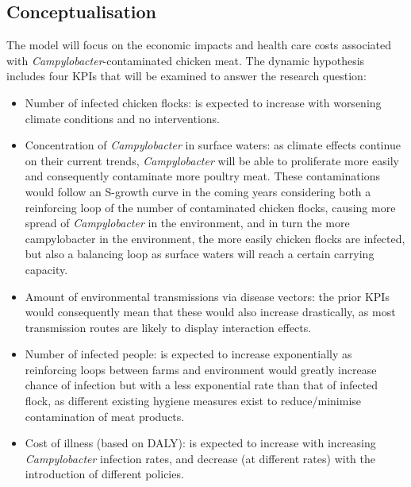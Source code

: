 \subsection{Conceptualisation}
The model will focus on the economic impacts and health care costs associated with \textit{Campylobacter}-contaminated chicken meat. 
The dynamic hypothesis includes four KPIs that will be examined to answer the research question: 
\begin{itemize}
    \item Number of infected chicken flocks: is expected to increase with worsening climate conditions and no interventions.
    \item Concentration of \textit{Campylobacter} in surface waters: as climate effects continue on their current trends, \textit{Campylobacter} will be able to proliferate more easily and consequently contaminate more poultry meat. These contaminations would follow an S-growth curve in the coming years considering both a reinforcing loop of the number of contaminated chicken flocks, causing more spread of \textit{Campylobacter} in the environment, and in turn the more campylobacter in the environment, the more easily chicken flocks are infected, but also a balancing loop as surface waters will reach a certain carrying capacity. %
    \item Amount of environmental transmissions via disease vectors: the prior KPIs would consequently mean that these would also increase drastically, as most transmission routes are likely to display interaction effects.
    \item Number of infected people: is expected to increase exponentially as reinforcing loops between farms and environment would greatly increase chance of infection but with a less exponential rate than that of infected flock, as different existing hygiene measures exist to reduce/minimise contamination of meat products.
    \item Cost of illness (based on DALY): is expected to increase with increasing \textit{Campylobacter} infection rates, and decrease (at different rates) with the introduction of different policies.
\end{itemize}
 
